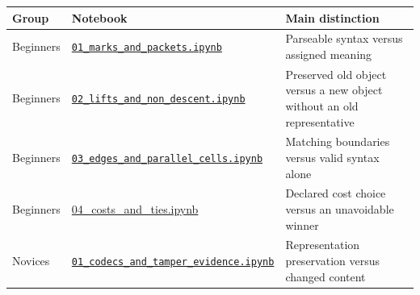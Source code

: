 \documentclass[
  11pt,
]{article}
\begin{document}
\begin{longtable}[]{@{}
  >{\raggedright\arraybackslash}p{}
  >{\raggedright\arraybackslash}p{}
  >{\raggedright\arraybackslash}p{}@{}}
\toprule\noalign{}
\begin{minipage}[b]{\linewidth}\raggedright
Group
\end{minipage} & \begin{minipage}[b]{\linewidth}\raggedright
Notebook
\end{minipage} & \begin{minipage}[b]{\linewidth}\raggedright
Main distinction
\end{minipage} \\
\midrule\noalign{}
\endhead
\bottomrule\noalign{}
\endlastfoot
Beginners &
\href{https://github.com/dbccpage/the_symbol_game/blob/52cb5457f6c485ba548cfd292f6012a941ed22cf/omega_engine_education/the_symbol_game/lessons/system_integration/000_beginners/01_marks_and_packets.ipynb}{\nolinkurl{01_marks_and_packets.ipynb}}
& Parseable syntax versus assigned meaning \\
Beginners &
\href{https://github.com/dbccpage/the_symbol_game/blob/52cb5457f6c485ba548cfd292f6012a941ed22cf/omega_engine_education/the_symbol_game/lessons/system_integration/000_beginners/02_lifts_and_non_descent.ipynb}{\nolinkurl{02_lifts_and_non_descent.ipynb}}
& Preserved old object versus a new object without an old
representative \\
Beginners &
\href{https://github.com/dbccpage/the_symbol_game/blob/52cb5457f6c485ba548cfd292f6012a941ed22cf/omega_engine_education/the_symbol_game/lessons/system_integration/000_beginners/03_edges_and_parallel_cells.ipynb}{\nolinkurl{03_edges_and_parallel_cells.ipynb}}
& Matching boundaries versus valid syntax alone \\
Beginners &
\href{https://github.com/dbccpage/the_symbol_game/blob/52cb5457f6c485ba548cfd292f6012a941ed22cf/omega_engine_education/the_symbol_game/lessons/system_integration/000_beginners/04_costs_and_ties.ipynb}{04\_costs\_and\_ties.ipynb}
& Declared cost choice versus an unavoidable winner \\
Novices &
\href{https://github.com/dbccpage/the_symbol_game/blob/52cb5457f6c485ba548cfd292f6012a941ed22cf/omega_engine_education/the_symbol_game/lessons/system_integration/100_novices/01_codecs_and_tamper_evidence.ipynb}{\nolinkurl{01_codecs_and_tamper_evidence.ipynb}}
& Representation preservation versus changed content \\

\end{longtable}
\end{document}
